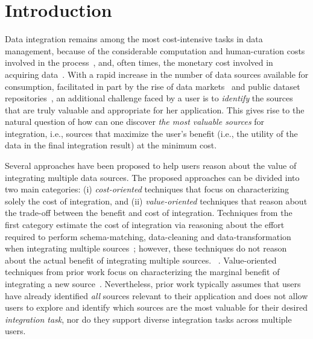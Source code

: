\documentclass{vldb}
\begin{document}
\section{Introduction}
\label{sec:intro}
Data integration remains among the most cost-intensive tasks in data management, because of the considerable computation and human-curation costs involved in the process~\cite{kruse2015estimating}, and, often times, the monetary cost involved in acquiring data~\cite{balazinska:vldb11}. With a rapid increase in the number of data sources available for consumption, facilitated in part by the rise of data markets~\cite{balazinska:vldb11} and public dataset repositories~\cite{datahub}, an additional challenge faced by a user is to {\em identify} the sources that are truly valuable and appropriate for her application. This gives rise to the natural question of how can one discover {\em the most valuable sources} for integration, i.e., sources that maximize the user's benefit (i.e., the utility of the data in the final integration result) at the minimum cost. 

Several approaches have been proposed to help users reason about the value of integrating multiple data sources. The proposed approaches can be divided into two main categories: (i) {\em cost-oriented} techniques that focus on characterizing solely the cost of integration, and (ii) {\em value-oriented} techniques that reason about the trade-off between the benefit and cost of integration. Techniques from the first category estimate the cost of integration via reasoning about the effort required to perform schema-matching, data-cleaning and data-transformation when integrating multiple sources~\cite{kruse2015estimating, smith:2009}; however, these techniques do not reason about the actual benefit of integrating multiple sources. ~\cite{rekatsinas:2015}. Value-oriented techniques from prior work focus on characterizing the marginal benefit of integrating a new source~\cite{dong:vldb13,rekatsinas:2014}. Nevertheless, prior work typically assumes that users have already identified {\em all} sources relevant to their application and does not allow users to explore and identify which sources are the most valuable for their desired {\em integration task}, nor do they support diverse integration tasks across multiple users.
\end{document}
